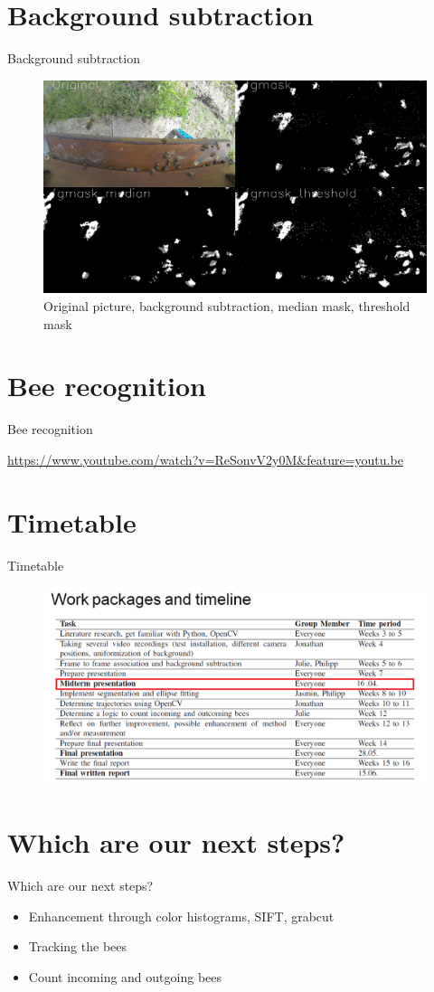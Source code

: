 \documentclass{beamer}
\begin{document}
\section{Background subtraction}
\begin{frame}{Background subtraction}
\begin{figure}
\includegraphics[scale=0.23]{pictures/backg2}
\caption{Original picture, background subtraction, median mask, threshold mask}
\end{figure}
\end{frame}

\section{Bee recognition}
\begin{frame}{Bee recognition}

\centering 
\url{https://www.youtube.com/watch?v=ReSonvV2y0M&feature=youtu.be}
\end{frame}

\section{Timetable}
\begin{frame}{Timetable}
\centering
\begin{figure}
\includegraphics[scale=0.07]{pictures/timeline}
\end{figure}
\end{frame}

\section{Which are our next steps?}
\begin{frame}{Which are our next steps?}
\begin{itemize}
\item Enhancement through color histograms, SIFT, grabcut
\item Tracking the bees
\item Count incoming and outgoing bees
\end{itemize}
\end{frame}
\end{document}
